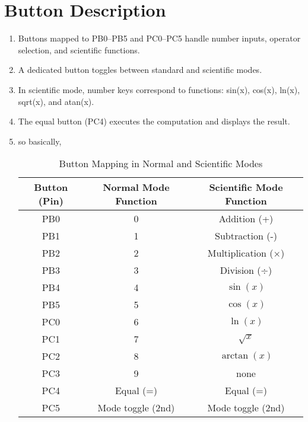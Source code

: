 \documentclass[journal]{IEEEtran}
\begin{document}
\section{Button Description}
\begin{enumerate}
    \item Buttons mapped to PB0--PB5 and PC0--PC5 handle number inputs, operator selection, and scientific functions.
    \item A dedicated button toggles between standard and scientific modes.
    \item In scientific mode, number keys correspond to functions: sin(x), cos(x), ln(x), sqrt(x), and atan(x).
    \item The equal button (PC4) executes the computation and displays the result.
    \item so basically, 
    \begin{table}[h!]
\centering
\caption{Button Mapping in Normal and Scientific Modes}
\begin{tabular}{|c|c|c|}
\hline
\textbf{Button (Pin)} & \textbf{Normal Mode Function} & \textbf{Scientific Mode Function} \\
\hline
PB0 & 0 & Addition (+) \\
PB1 & 1 & Subtraction (-) \\
PB2 & 2 & Multiplication (×) \\
PB3 & 3 & Division (÷) \\
PB4 & 4 & $\sin(x)$ \\
PB5 & 5 & $\cos(x)$ \\
PC0 & 6 & $\ln(x)$ \\
PC1 & 7 & $\sqrt{x}$ \\
PC2 & 8 & $\arctan(x)$ \\
PC3 & 9 & none \\
PC4 & Equal (=) & Equal (=) \\
PC5 & Mode toggle (2nd) & Mode toggle (2nd) \\
\hline
\end{tabular}
\end{table}

\end{enumerate}
\end{document}
